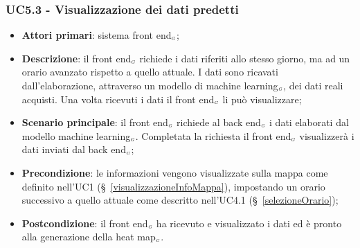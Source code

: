 \subsubsection{UC5.3 - Visualizzazione dei dati predetti}\label{richiestaDatiPredetti}
\begin{itemize}
	\item \textbf{Attori primari}: sistema front end$_{\scaleto{G}{3pt}}$;
	\item \textbf{Descrizione}: il front end$_{\scaleto{G}{3pt}}$ richiede i dati riferiti allo stesso giorno, ma ad un orario avanzato rispetto a quello attuale.
	I dati sono ricavati dall’elaborazione, attraverso un modello di machine learning$_{\scaleto{G}{3pt}}$, dei dati reali acquisti. Una volta ricevuti i dati il front end$_{\scaleto{G}{3pt}}$ li può visualizzare;
	\item \textbf{Scenario principale}: il front end$_{\scaleto{G}{3pt}}$ richiede al back end$_{\scaleto{G}{3pt}}$ i dati elaborati dal modello machine learning$_{\scaleto{G}{3pt}}$. Completata la richiesta il front end$_{\scaleto{G}{3pt}}$ visualizzerà i dati inviati dal back end$_{\scaleto{G}{3pt}}$;
	\item \textbf{Precondizione}: le informazioni vengono visualizzate sulla mappa come definito nell’UC1 (\S~\ref{visualizzazioneInfoMappa}), impostando un orario successivo a quello attuale come descritto nell’UC4.1 (\S~\ref{selezioneOrario});
	\item \textbf{Postcondizione}: il front end$_{\scaleto{G}{3pt}}$ ha ricevuto e visualizzato i dati ed è pronto alla generazione della heat map$_{\scaleto{G}{3pt}}$. 
\end{itemize}

